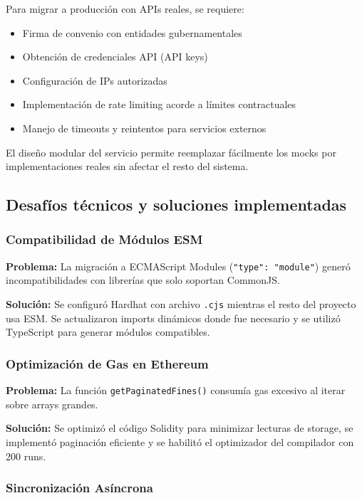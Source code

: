 Para migrar a producción con APIs reales, se requiere:
\begin{itemize}
    \item Firma de convenio con entidades gubernamentales
    \item Obtención de credenciales API (API keys)
    \item Configuración de IPs autorizadas
    \item Implementación de rate limiting acorde a límites contractuales
    \item Manejo de timeouts y reintentos para servicios externos
\end{itemize}

El diseño modular del servicio permite reemplazar fácilmente los mocks por implementaciones reales sin afectar el resto del sistema.

\subsection{Desafíos técnicos y soluciones implementadas}

\subsubsection{Compatibilidad de Módulos ESM}

\textbf{Problema:} La migración a ECMAScript Modules (\texttt{"type": "module"}) generó incompatibilidades con librerías que solo soportan CommonJS.

\textbf{Solución:} Se configuró Hardhat con archivo \texttt{.cjs} mientras el resto del proyecto usa ESM. Se actualizaron imports dinámicos donde fue necesario y se utilizó TypeScript para generar módulos compatibles.

\subsubsection{Optimización de Gas en Ethereum}

\textbf{Problema:} La función \texttt{getPaginatedFines()} consumía gas excesivo al iterar sobre arrays grandes.

\textbf{Solución:} Se optimizó el código Solidity para minimizar lecturas de storage, se implementó paginación eficiente y se habilitó el optimizador del compilador con 200 runs.

\subsubsection{Sincronización Asíncrona}

